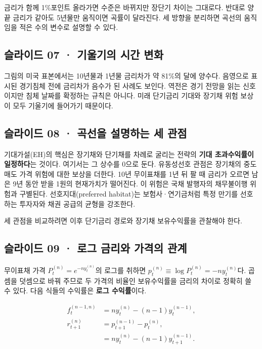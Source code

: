 \documentclass[11pt,a4paper]{article}
\begin{document}
금리가 함께 1\%포인트 올라가면 수준은 바뀌지만 장단기 차이는 그대로다. 반대로 양 끝 금리가 같아도 5년물만 움직이면 곡률이 달라진다. 세 방향을 분리하면 곡선의 움직임을 적은 수의 변수로 설명할 수 있다.\par

\subsection{슬라이드 07 · 기울기의 시간 변화}
그림의 미국 표본에서는 10년물과 1년물 금리차가 약 81\%의 달에 양수다. 음영으로 표시된 경기침체 전에 금리차가 음수가 된 사례도 보인다. 역전은 경기 전망을 읽는 신호이지만 침체 날짜를 확정하는 규칙은 아니다. 미래 단기금리 기대와 장기채 위험 보상이 모두 기울기에 들어가기 때문이다.\par

\subsection{슬라이드 08 · 곡선을 설명하는 세 관점}
기대가설(EH)의 핵심은 장기채와 단기채를 차례로 굴리는 전략의 \textbf{기대 초과수익률이 일정하다}는 것이다. 여기서는 그 상수를 0으로 둔다. 유동성선호 관점은 장기채의 중도 매도 가격 위험에 대한 보상을 더한다. 10년 무이표채를 1년 뒤 팔 때 금리가 오르면 남은 9년 동안 받을 1원의 현재가치가 떨어진다. 이 위험은 국채 발행자의 채무불이행 위험과 구별된다. 선호지대(preferred habitat)는 보험사·연기금처럼 특정 만기를 선호하는 투자자와 채권 공급의 균형을 강조한다.\par

세 관점을 비교하려면 이후 단기금리 경로와 장기채 보유수익률을 관찰해야 한다.\par

\subsection{슬라이드 09 · 로그 금리와 가격의 관계}
무이표채 가격 $P_t^{(n)}=e^{-ny_t^{(n)}}$의 로그를 취하면 $p_t^{(n)}\equiv\log P_t^{(n)}=-ny_t^{(n)}$다. 곱셈을 덧셈으로 바꿔 주므로 두 가격의 비율인 보유수익률을 금리의 차이로 정확히 쓸 수 있다. 다음 식들의 수익률은 \textbf{로그 수익률}이다.\par

\[
\begin{aligned}
f_t^{(n-1,n)}&=ny_t^{(n)}-(n-1)y_t^{(n-1)},\\
r_{t+1}^{(n)}&=p_{t+1}^{(n-1)}-p_t^{(n)},\\
&=ny_t^{(n)}-(n-1)y_{t+1}^{(n-1)}.
\end{aligned}
\]
\end{document}
